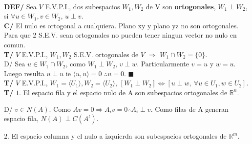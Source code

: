 \documentclass[10pt,a4paper]{article}
\newcommand*{\QEDA}{\null\nobreak\hfill\ensuremath{\blacksquare}}
\begin{document}
\dotfill\\
\textbf{DEF/} Sea $V$ E.V.P.I., dos subespacios $W_1, W_2$ de V son \textbf{ortogonales}, $W_1 \perp W_2$, si $\forall u \in W_1, v \in W_2$, $u \perp v$.\\
\textbf{C/} El nulo es ortogonal a cualquiera. Plano xy y plano yz no son ortogonales. Para que 2 S.E.V. sean ortogonales no pueden tener ningun vector no nulo en comun.\\
\textbf{T/} $V$ E.V.P.I., $W_1, W_2$ S.E.V. ortogonales de $V$ $\Rightarrow$ $W_1 \cap W_2 = \{0\}$.\\
D/ Sea $u \in W_1 \cap W_2$, como $W_1 \perp W_2$, $v \perp w$. Particularmente $v=u$ y $w=u$. Luego resulta $u \perp u$ ie $\langle u,u \rangle=0$ $\therefore u = 0$. \QEDA\\
\textbf{T/} $V$ E.V.P.I., $W_1 = \langle U_1 \rangle, W_2 = \langle U_2 \rangle$, $[W_1 \perp W_2] \iff [u \perp w,\ \forall u \in U_1, w \in U_2]$.\\
\textbf{T/} $1.$ El espacio fila y el espacio nulo de A son subespacios ortogonales de $\mathbb{R}^n$.
{

\qquad
D/ $v \in N(A)$. Como $Av = 0 \Rightarrow A_iv=0 \therefore A_i \perp v$. Como filas de A generan espacio fila, $N(A) \perp C(A^t)$.
}
{

\qquad $2.$ El espacio columna y el nulo a izquierda son subespacios ortogonales de $\mathbb{R}^m$.
}
\end{document}
